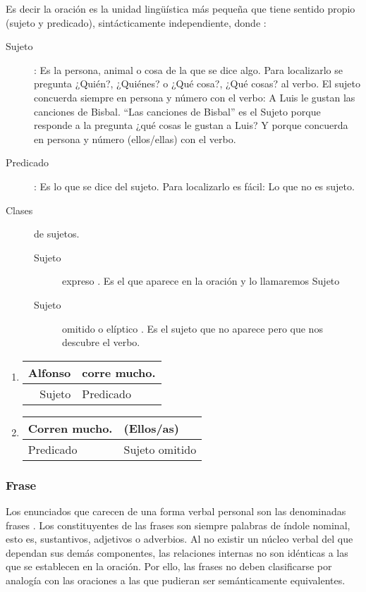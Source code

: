Es decir la oración es la unidad lingüística más pequeña que tiene
sentido propio (sujeto y predicado), sintácticamente independiente,
donde :
\begin{description}
\item [{Sujeto}] : Es la persona, animal o cosa de la que se dice algo.
Para localizarlo se pregunta \textsf{¿Quién?, ¿Quiénes? o ¿Qué cosa?,
¿Qué cosas?} al verbo. \medskip{}
\textsf{El sujeto concuerda siempre en persona y número con el verbo}:
A Luis le gustan\textsf{ las canciones de Bisbal}. “Las canciones
de Bisbal” es el Sujeto porque responde a la pregunta ¿qué cosas le
gustan a Luis? Y porque concuerda en persona y número (ellos/ellas)
con el verbo.
\item [{Predicado}] : Es lo que se dice del sujeto. Para localizarlo es
fácil: \textquotedbl{}\textsf{Lo que no es sujeto}\textquotedbl{}. 
\item [{Clases}] de sujetos. 

\begin{description}
\item [{Sujeto}] expreso . Es el que aparece en la oración y lo llamaremos
Sujeto 
\item [{Sujeto}] omitido o elíptico . Es el sujeto que no aparece pero
que nos descubre el verbo.
\end{description}
\end{description}
\begin{ejems}{}\begin{enumerate} 

\item %
\begin{tabular}{r|l}
\multicolumn{1}{r}{Alfonso} & corre mucho.\tabularnewline
\hline 
Sujeto & Predicado\tabularnewline
\end{tabular}

\item%
\begin{tabular}{l|l}
Corren mucho.  & (Ellos/as)\tabularnewline
\hline 
Predicado & Sujeto omitido\tabularnewline
\end{tabular}

\end{enumerate}\end{ejems}


\subsubsection{Frase }

Los enunciados que carecen de una forma verbal personal son las denominadas
frases . Los constituyentes de las frases son siempre palabras de
índole nominal, esto es, sustantivos, adjetivos o adverbios. Al no
existir un núcleo verbal del que dependan sus demás componentes, las
relaciones internas no son idénticas a las que se establecen en la
oración. Por ello, las frases no deben clasificarse por analogía con
las oraciones a las que pudieran ser semánticamente equivalentes.

